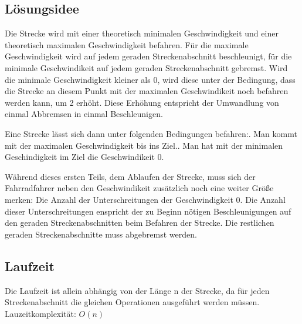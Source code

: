\subsection {Lösungsidee}
	Die Strecke wird mit einer theoretisch minimalen Geschwindigkeit und einer theoretisch maximalen Geschwindigkeit befahren. 
	Für die maximale Geschwindigkeit wird auf jedem geraden Streckenabschnitt beschleunigt, für die minimale Geschwindikeit auf
	jedem geraden Streckenabschnitt gebremst. Wird die minimale Geschwindigkeit kleiner als 0, wird diese unter der Bedingung, 
	dass die Strecke an diesem Punkt mit der maximalen Geschwindikeit noch befahren werden kann, um 2 erhöht. 
	Diese Erhöhung entspricht der Umwandlung von einmal Abbremsen in einmal Beschleunigen.
	
	Eine Strecke lässt sich dann unter folgenden Bedingungen befahren:. Man kommt mit der maximalen Geschwindigkeit bis ins Ziel.. Man hat mit der minimalen Geschindigkeit im Ziel die Geschwindikeit 0.

	Während dieses ersten Teils, dem Ablaufen der Strecke, muss sich der Fahrradfahrer neben den Geschwindikeit zusätzlich noch
	eine weiter Größe merken: Die Anzahl der Unterschreitungen der Geschwindigkeit 0. Die Anzahl dieser Unterschreitungen enspricht
	der zu Beginn nötigen Beschleunigungen auf den geraden Streckenabschnitten beim Befahren der Strecke. Die restlichen geraden Streckenabschnitte muss abgebremst werden.
\subsection{Laufzeit}
	Die Laufzeit ist allein abhängig von der Länge n der Strecke, da für jeden Streckenabschnitt die gleichen Operationen ausgeführt werden müssen. Lauzeitkomplexität: \(O(n)\)
